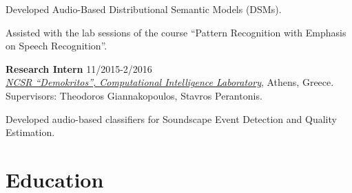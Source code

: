 \documentclass[letterpaper]{article}
\renewenvironment{itemize}{
  \begin{list}{}{
    \setlength{\leftmargin}{1.5em}
  }
}{
  \end{list}
}
\begin{document}
\begin{itemize}
    \begin{itemize}
    \item 
        Developed Audio-Based Distributional Semantic Models     (DSMs).
    \item 
        Assisted with the lab sessions of the course ``Pattern Recognition with Emphasis on Speech Recognition''.
    \end{itemize}
\fi
\item 
    \textbf{Research Intern} \hfill 11/2015-2/2016\\
    \href{https://www.iit.demokritos.gr/cil/}{\it NCSR ``Demokritos'', Computational Intelligence Laboratory}, Athens, Greece.\\
    Supervisors: Theodoros Giannakopoulos, Stavros Perantonis.


    \begin{itemize}
        Developed audio-based classifiers for Soundscape Event Detection and Quality Estimation.
    \end{itemize}

\end{itemize}

\section*{Education}
\end{document}
